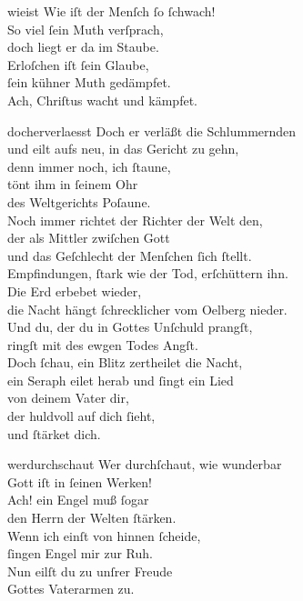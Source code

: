 \documentclass[shorttitlesize=55,tocstyle=ref-genre]{ees}
\begin{document}
{\begin{movement}{wieist}
  \voice[Coro]
  Wie iſt der Menſch ſo ſchwach!\\
  So viel ſein Muth verſprach,\\
  doch liegt er da im Staube.\\
  Erloſchen iſt ſein Glaube,\\
  ſein kühner Muth gedämpfet.\\
  Ach, Chriſtus wacht und kämpfet.
\end{movement}

\begin{movement}{docherverlaesst}
  \voice[Basso]
  Doch er verläßt die Schlummernden\\
  und eilt aufs neu, in das Gericht zu gehn,\\
  denn immer noch, ich ſtaune,\\
  tönt ihm in ſeinem Ohr\\
  des Weltgerichts Poſaune.\\
  Noch immer richtet der Richter der Welt den,\\
  der als Mittler zwiſchen Gott\\
  und das Geſchlecht der Menſchen ſich ſtellt.\\
  Empfindungen, ſtark wie der Tod, erſchüttern ihn.\\
  Die Erd erbebet wieder,\\
  die Nacht hängt ſchrecklicher vom Oelberg nieder.\\
  Und du, der du in Gottes Unſchuld prangſt,\\
  ringſt mit des ewgen Todes Angſt.\\
  Doch ſchau, ein Blitz zertheilet die Nacht,\\
  ein Seraph eilet herab und ſingt ein Lied\\
  von deinem Vater dir,\\
  der huldvoll auf dich ſieht,\\
  und ſtärket dich.
\end{movement}

\begin{movement}{werdurchschaut}
  \voice[Basso]
  Wer durchſchaut, wie wunderbar\\
  Gott iſt in ſeinen Werken!\\
  Ach! ein Engel muß ſogar\\
  den Herrn der Welten ſtärken.\\
  Wenn ich einſt von hinnen ſcheide,\\
  ſingen Engel mir zur Ruh.\\
  Nun eilſt du zu unſrer Freude\\
  Gottes Vaterarmen zu.
\end{movement}

}
\end{document}
